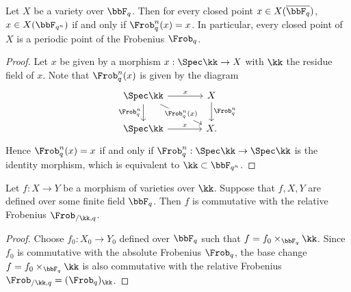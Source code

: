 \begin{proposition}
	Let $X$ be a variety over $\bbF_{q}$.
	Then for every closed point $x \in X(\overline{\bbF_q})$, $x \in X(\bbF_{q^n})$ if and only if $\Frob_{q}^n(x) = x$.
	In particular, every closed point of $X$ is a periodic point of the Frobenius $\Frob_q$.
\end{proposition}
\begin{proof}
	Let $x$ be given by a morphism $x: \Spec \kk \to X$ with $\kk$ the residue field of $x$.
	Note that $\Frob_q^n(x)$ is given by the diagram
	\[ \begin{tikzcd}[column sep=large]
			\Spec \kk \arrow[r, "x"] \arrow[rd, "\Frob_q^n(x)" description] \arrow[d,"\Frob_q^n"'] & X \arrow[d, "\Frob_q^n"] \\
			\Spec \kk \arrow[r, "x"] & X.
		\end{tikzcd} \]
	Hence $\Frob_q^n(x) = x$ if and only if $\Frob_q^n: \Spec \kk \to \Spec \kk$ is the identity morphism, which is equivalent to $\kk \subset \bbF_{q^n}$.
\end{proof}

\begin{proposition}
	Let $f: X \to Y$ be a morphism of varieties over $\kk$.
	Suppose that $f,X,Y$ are defined over some finite field $\bbF_q$.
	Then $f$ is commutative with the relative Frobenius $\Frob_{/\kk,q}$.
\end{proposition}
\begin{proof}
	Choose $f_0: X_0 \to Y_0$ defined over $\bbF_q$ such that $f = f_0 \times_{\bbF_q} \kk$.
	Since $f_0$ is commutative with the absolute Frobenius $\Frob_q$, the base change $f = f_0 \times_{\bbF_q} \kk$ is also commutative with the relative Frobenius $\Frob_{/\kk,q} = (\Frob_q)_\kk$.
\end{proof}
